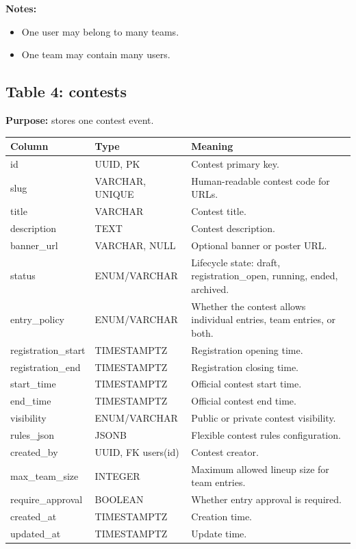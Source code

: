 \documentclass[11pt,a4paper]{article}
\begin{document}
\textbf{Notes:}
\begin{itemize}
    \item One user may belong to many teams.
    \item One team may contain many users.
\end{itemize}

\subsection{Table 4: contests}
\textbf{Purpose:} stores one contest event.

\begin{longtable}{>{\raggedright\arraybackslash}p{} >{\raggedright\arraybackslash}p{} >{\raggedright\arraybackslash}p{}}
\toprule
\textbf{Column} & \textbf{Type} & \textbf{Meaning} \\
\midrule
id & UUID, PK & Contest primary key. \\
slug & VARCHAR, UNIQUE & Human-readable contest code for URLs. \\
title & VARCHAR & Contest title. \\
description & TEXT & Contest description. \\
banner\_url & VARCHAR, NULL & Optional banner or poster URL. \\
status & ENUM/VARCHAR & Lifecycle state: draft, registration\_open, running, ended, archived. \\
entry\_policy & ENUM/VARCHAR & Whether the contest allows individual entries, team entries, or both. \\
registration\_start & TIMESTAMPTZ & Registration opening time. \\
registration\_end & TIMESTAMPTZ & Registration closing time. \\
start\_time & TIMESTAMPTZ & Official contest start time. \\
end\_time & TIMESTAMPTZ & Official contest end time. \\
visibility & ENUM/VARCHAR & Public or private contest visibility. \\
rules\_json & JSONB & Flexible contest rules configuration. \\
created\_by & UUID, FK users(id) & Contest creator. \\
max\_team\_size & INTEGER & Maximum allowed lineup size for team entries. \\
require\_approval & BOOLEAN & Whether entry approval is required. \\
created\_at & TIMESTAMPTZ & Creation time. \\
updated\_at & TIMESTAMPTZ & Update time. \\
\bottomrule
\end{longtable}
\end{document}
